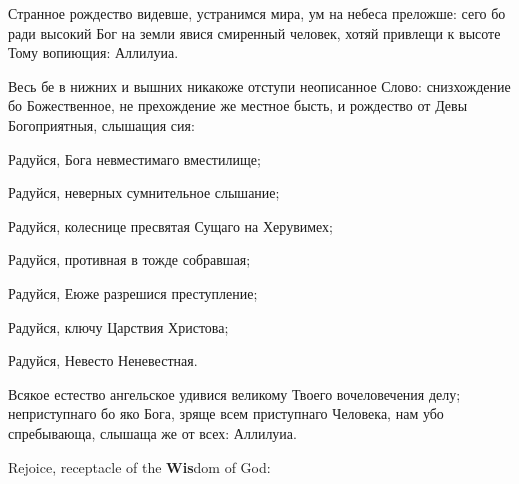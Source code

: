 \Ierei Странное рождество видевше, устранимся мира, ум на небеса преложше: сего бо ради высокий Бог на земли явися смиренный человек, хотяй привлещи к высоте Тому вопиющия: Аллилуиа.


\Ierei Весь бе в нижних и вышних никакоже отступи неописанное Слово: снизхождение бо Божественное, не прехождение же местное бысть, и рождество от Девы Богоприятныя, слышащия сия:

Радуйся, Бога невместимаго вместилище;


Радуйся, неверных сумнительное слышание;


Радуйся, колеснице пресвятая Сущаго на Херувимех;


Радуйся, противная в тожде собравшая;


Радуйся, Еюже разрешися преступление;


Радуйся, ключу Царствия Христова;


Радуйся, Невесто Неневестная.


\Ierei Всякое естество ангельское удивися великому Твоего вочеловечения делу; неприступнаго бо яко Бога, зряще всем приступнаго Человека, нам убо спребывающа, слышаща же от всех: Аллилуиа.

\pagebreak





\PeopleRejoice Rejoice, receptacle of the \textbf{Wis}dom of God:


